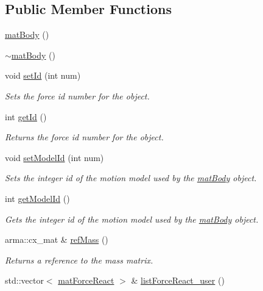 \subsection*{Public Member Functions}
\begin{DoxyCompactItemize}
\item 
\hyperlink{classosea_1_1ofreq_1_1mat_body_adbcb73fc9873660ca781493b2b2742a2}{mat\-Body} ()
\item 
\hyperlink{classosea_1_1ofreq_1_1mat_body_afcc3a6a87689dfbb5dfa72648a46c355}{$\sim$mat\-Body} ()
\item 
void \hyperlink{classosea_1_1ofreq_1_1mat_body_abb86318fbd7300ed01eae308551f9e96}{set\-Id} (int num)
\begin{DoxyCompactList}\small\item\em Sets the force id number for the object. \end{DoxyCompactList}\item 
int \hyperlink{classosea_1_1ofreq_1_1mat_body_a551183ad56eeba71ea4690574b1841e4}{get\-Id} ()
\begin{DoxyCompactList}\small\item\em Returns the force id number for the object. \end{DoxyCompactList}\item 
void \hyperlink{classosea_1_1ofreq_1_1mat_body_abb8ea32c84153da5dfc53d7b0dc836a5}{set\-Model\-Id} (int num)
\begin{DoxyCompactList}\small\item\em Sets the integer id of the motion model used by the \hyperlink{classosea_1_1ofreq_1_1mat_body}{mat\-Body} object. \end{DoxyCompactList}\item 
int \hyperlink{classosea_1_1ofreq_1_1mat_body_ae4c339b7ce6a93cf6e54bc998cbd5903}{get\-Model\-Id} ()
\begin{DoxyCompactList}\small\item\em Gets the integer id of the motion model used by the \hyperlink{classosea_1_1ofreq_1_1mat_body}{mat\-Body} object. \end{DoxyCompactList}\item 
arma\-::cx\-\_\-mat \& \hyperlink{classosea_1_1ofreq_1_1mat_body_a7c0b44be2aa75ae270168849c06e6067}{ref\-Mass} ()
\begin{DoxyCompactList}\small\item\em Returns a reference to the mass matrix. \end{DoxyCompactList}\item 
std\-::vector$<$ \hyperlink{classosea_1_1ofreq_1_1mat_force_react}{mat\-Force\-React} $>$ \& \hyperlink{classosea_1_1ofreq_1_1mat_body_aeb296f7c56b523b32ca12b58de56ef37}{list\-Force\-React\-\_\-user} ()

\end{DoxyCompactItemize}

